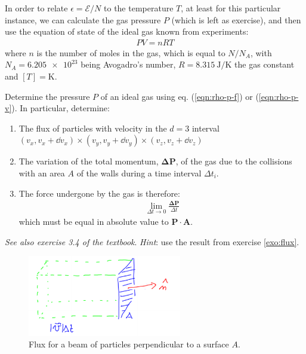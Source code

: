 \documentclass[../template.tex]{subfiles}
\begin{document}
In order to relate $\epsilon = \mathcal{E}/N$ to the temperature $T$, at least for this particular instance, we can calculate the gas pressure $P$ (which is left as exercise), and then use the equation of state of the ideal gas known from experiments:
\begin{align} \label{eqn:state}
    PV = nRT
\end{align}
where $n$ is the number of moles in the gas, which is equal to $N/N_A$, with $N_A = \num{6.205e23}$ being Avogadro's number, $R = \SI{8.315}{\J\per\K}$ the gas constant and $[T] = \si{\K}$.

\begin{exo}
    Determine the pressure $P$ of an ideal gas using eq. (\ref{eqn:rho-p-f}) or (\ref{eqn:rho-p-v}). In particular, determine:
    \begin{enumerate}[label=\alph*.]
        \item The flux of particles with velocity in the $d=3$ interval $(v_x, v_x+\dd{v_x}) \times (v_y, v_y + \dd{v_y}) \times (v_z, v_z + \dd{v_z})$
        \item The variation of the total momentum, $\bm{\Delta P}$, of the gas due to the collisions with an area $A$ of the walls during a time interval $\Delta t_i$.
        \item The force undergone by the gas is therefore:
        \begin{align*}
            \lim_{\Delta t \to 0} \frac{\bm{\Delta P}}{\Delta t} 
        \end{align*}
        which must be equal in absolute value to $\bm{P} \cdot \bm{A}$. 
    \end{enumerate}

    \textit{See also exercise 3.4 of the textbook}. \textit{Hint}: use the result from exercise \ref{exo:flux}. 

    \medskip

    
\end{exo}
\begin{figure}[hbp]
    \centering
    \includegraphics[width=0.6\textwidth]{image002.png}
    \caption{Flux for a beam of particles perpendicular to a surface $A$.\label{fig:flux}}
\end{figure}
\end{document}
